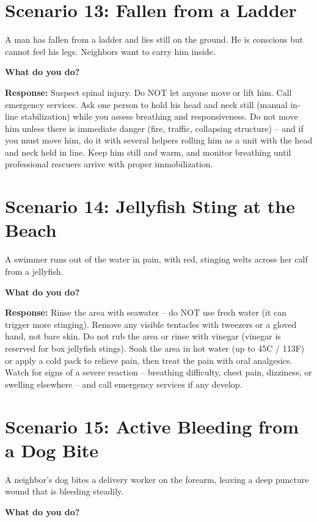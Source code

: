 \section{Scenario 13: Fallen from a Ladder}

A man has fallen from a ladder and lies still on the ground. He is conscious but cannot feel his legs. Neighbors want to carry him inside.

\textbf{What do you do?}

\textbf{Response:} Suspect spinal injury. Do NOT let anyone move or lift him. Call emergency services. Ask one person to hold his head and neck still (manual in-line stabilization) while you assess breathing and responsiveness. Do not move him unless there is immediate danger (fire, traffic, collapsing structure) -- and if you must move him, do it with several helpers rolling him as a unit with the head and neck held in line. Keep him still and warm, and monitor breathing until professional rescuers arrive with proper immobilization.

\section{Scenario 14: Jellyfish Sting at the Beach}

A swimmer runs out of the water in pain, with red, stinging welts across her calf from a jellyfish.

\textbf{What do you do?}

\textbf{Response:} Rinse the area with seawater -- do NOT use fresh water (it can trigger more stinging). Remove any visible tentacles with tweezers or a gloved hand, not bare skin. Do not rub the area or rinse with vinegar (vinegar is reserved for box jellyfish stings). Soak the area in hot water (up to 45\textdegree C / 113\textdegree F) or apply a cold pack to relieve pain, then treat the pain with oral analgesics. Watch for signs of a severe reaction -- breathing difficulty, chest pain, dizziness, or swelling elsewhere -- and call emergency services if any develop.

\section{Scenario 15: Active Bleeding from a Dog Bite}

A neighbor's dog bites a delivery worker on the forearm, leaving a deep puncture wound that is bleeding steadily.

\textbf{What do you do?}

